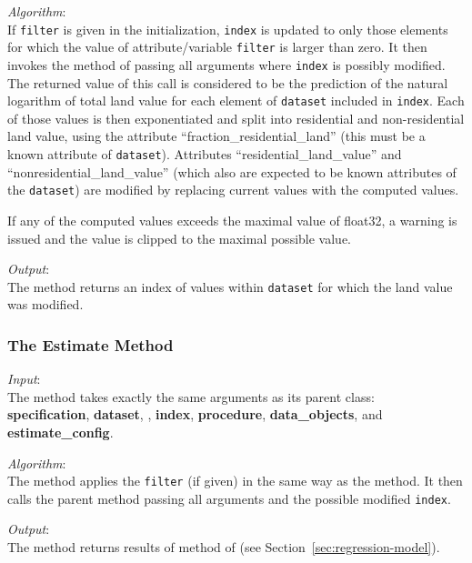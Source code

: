 {\it Algorithm}:\\[1mm]
If \verb|filter| is given in the initialization, \verb|index| is
updated to only those elements for which the value of
attribute/variable \attributesindex\variablesindex \verb|filter| is
larger than zero. It then invokes the  method of
 \modelsindex passing all arguments where
\verb|index| is possibly modified. The returned value of this call
is considered to be the prediction of the natural logarithm of total
land value for each element of \verb|dataset| included in
\verb|index|. Each of those values is then exponentiated and split
into residential and non-residential land value, using the attribute
\attributesindex ``fraction_residential_land'' (this must be a known
attribute \attributesindex of \verb|dataset|). \datasetindex
Attributes \attributesindex ``residential_land_value'' and
``nonresidential_land_value'' (which also are expected to be known
attributes \attributesindex of the \verb|dataset|) are modified by
replacing current values with the computed values.

If any of the computed values exceeds the maximal value of float32, a warning
is issued and the value is clipped to the maximal possible value.

{\it Output}:\\[1mm]
The method returns an index of values within \verb|dataset| \datasetindex for which the land
value was modified.

\subsubsection{The Estimate Method}
{\it Input}:\\[1mm]
The  method takes exactly the same arguments as its parent
class: \\
{\bf specification}, {\bf dataset}, , {\bf index}, {\bf
  procedure}, {\bf data_objects}, and {\bf estimate_config}.

{\it Algorithm}:\\[1mm]
The method applies the \verb|filter| (if given) in the same way as the
 method. It then calls the parent method 
passing all arguments and the possible modified \verb|index|.

{\it Output}:\\[1mm]
The method returns results of  method of
 \modelsindex (see Section~\ref{sec:regression-model}).

